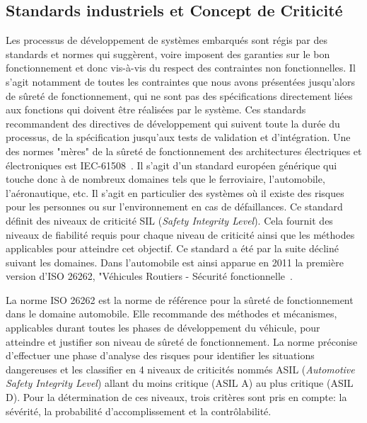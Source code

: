 \documentclass[french, a4paper, 11pt, twoside, pdftex]{StyleThese}
\begin{document}
		\subsection{Standards industriels et Concept de Criticité}	
		Les processus de développement de systèmes embarqués sont régis par des standards et normes qui suggèrent, voire imposent des garanties sur le bon fonctionnement et donc vis-à-vis du respect des contraintes non fonctionnelles. Il s'agit notamment de toutes les contraintes que nous avons présentées jusqu'alors de sûreté de fonctionnement, qui ne sont pas des spécifications directement liées aux fonctions qui doivent être réalisées par le système. Ces standards recommandent des directives de développement qui suivent toute la durée du processus, de la spécification jusqu'aux tests de validation et d'intégration. Une des normes "mères" de la sûreté de fonctionnement des architectures électriques et électroniques est IEC-61508~\cite{iec61508}. Il s'agit d'un standard européen générique qui touche donc à de nombreux domaines tels que le ferroviaire, l'automobile, l'aéronautique, etc. Il s'agit en particulier des systèmes où il existe des risques pour les personnes ou sur l'environnement en cas de défaillances. Ce standard définit des niveaux de criticité SIL (\textit{Safety Integrity Level}). Cela fournit des niveaux de fiabilité requis pour chaque niveau de criticité ainsi que les méthodes applicables pour atteindre cet objectif. Ce standard a été par la suite décliné suivant les domaines. Dans l'automobile est ainsi apparue en 2011 la première version d'ISO 26262, "Véhicules Routiers - Sécurité fonctionnelle~\cite{iso_tc22sc3wg16_iso_2011}. 

		
		La norme ISO 26262 est la norme de référence pour la sûreté de fonctionnement dans le domaine automobile. Elle recommande des méthodes et mécanismes, applicables durant toutes les phases de développement du véhicule, pour atteindre et justifier son niveau de sûreté de fonctionnement. La norme préconise d’effectuer une phase d’analyse des risques pour identifier les situations dangereuses et les classifier en 4 niveaux de criticités nommés ASIL (\textit{Automotive Safety Integrity Level}) allant du moins critique (ASIL A) au plus critique (ASIL D). Pour la détermination de ces niveaux, trois critères sont pris en compte: la sévérité, la probabilité d'accomplissement et la contrôlabilité.
		
\end{document}

